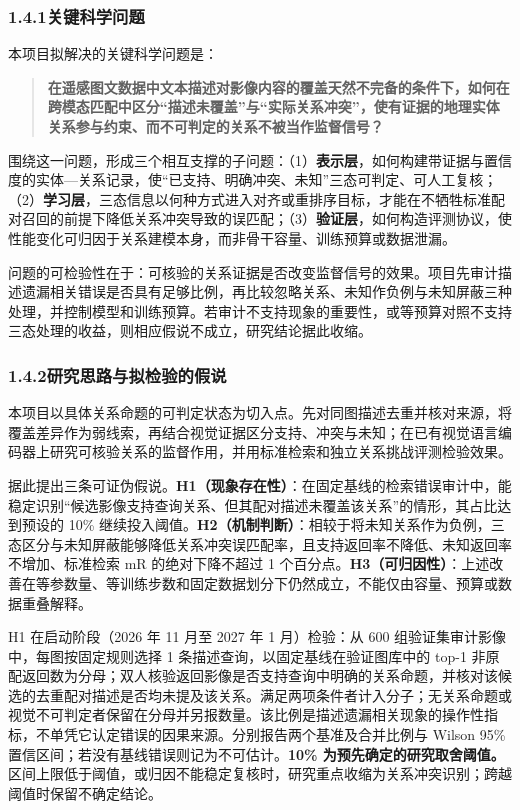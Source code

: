 \subsubsection*{1.4.1\quad 关键科学问题}

本项目拟解决的关键科学问题是：

\begin{quote}
\textbf{在遥感图文数据中文本描述对影像内容的覆盖天然不完备的条件下，如何在跨模态匹配中区分“描述未覆盖”与“实际关系冲突”，使有证据的地理实体关系参与约束、而不可判定的关系不被当作监督信号？}
\end{quote}

围绕这一问题，形成三个相互支撑的子问题：（1）\textbf{表示层}，如何构建带证据与置信度的实体—关系记录，使“已支持、明确冲突、未知”三态可判定、可人工复核；（2）\textbf{学习层}，三态信息以何种方式进入对齐或重排序目标，才能在不牺牲标准配对召回的前提下降低关系冲突导致的误匹配；（3）\textbf{验证层}，如何构造评测协议，使性能变化可归因于关系建模本身，而非骨干容量、训练预算或数据泄漏。

问题的可检验性在于：可核验的关系证据是否改变监督信号的效果。项目先审计描述遗漏相关错误是否具有足够比例，再比较忽略关系、未知作负例与未知屏蔽三种处理，并控制模型和训练预算。若审计不支持现象的重要性，或等预算对照不支持三态处理的收益，则相应假说不成立，研究结论据此收缩。

\subsubsection*{1.4.2\quad 研究思路与拟检验的假说}

本项目以具体关系命题的可判定状态为切入点。先对同图描述去重并核对来源，将覆盖差异作为弱线索，再结合视觉证据区分支持、冲突与未知；在已有视觉语言编码器上研究可核验关系的监督作用，并用标准检索和独立关系挑战评测检验效果。

据此提出三条可证伪假说。\textbf{H1（现象存在性）}：在固定基线的检索错误审计中，能稳定识别“候选影像支持查询关系、但其配对描述未覆盖该关系”的情形，其占比达到预设的 10\% 继续投入阈值。\textbf{H2（机制判断）}：相较于将未知关系作为负例，三态区分与未知屏蔽能够降低关系冲突误匹配率，且支持返回率不降低、未知返回率不增加、标准检索 mR 的绝对下降不超过 1 个百分点。\textbf{H3（可归因性）}：上述改善在等参数量、等训练步数和固定数据划分下仍然成立，不能仅由容量、预算或数据重叠解释。

H1 在启动阶段（2026 年 11 月至 2027 年 1 月）检验：从 600 组验证集审计影像中，每图按固定规则选择 1 条描述查询，以固定基线在验证图库中的 top-1 非原配返回数为分母；双人核验返回影像是否支持查询中明确的关系命题，并核对该候选的去重配对描述是否均未提及该关系。满足两项条件者计入分子；无关系命题或视觉不可判定者保留在分母并另报数量。该比例是描述遗漏相关现象的操作性指标，不单凭它认定错误的因果来源。分别报告两个基准及合并比例与 Wilson 95\% 置信区间；若没有基线错误则记为不可估计。\textbf{10\% 为预先确定的研究取舍阈值。}区间上限低于阈值，或归因不能稳定复核时，研究重点收缩为关系冲突识别；跨越阈值时保留不确定结论。

